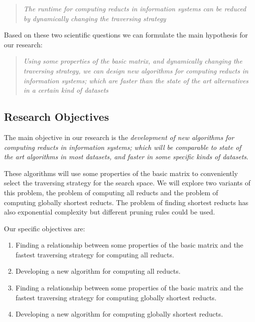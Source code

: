 \documentclass[authoryear,11pt]{elsarticle}
\begin{document}
\begin{quote}
  \emph{The runtime for computing reducts in information systems can be reduced by 
  		dynamically changing the traversing strategy}
\end{quote}

  Based on these two scientific questions we can formulate the main hypothesis for our research:
  
\begin{quote}
  \emph{Using some properties of the basic matrix, and dynamically changing the traversing 
  		strategy, we can design new algorithms for computing reducts in information systems; which are
  		faster than the state of the art alternatives in a certain kind of datasets}
\end{quote}  

\subsection{Research Objectives}\label{Goals} 
  The main objective in our research is the \emph{development of new algorithms for computing reducts in
  information systems; which will be comparable to state of the art algorithms 
  in most datasets, and faster in some specific kinds of datasets}. 
  
  These algorithms will use some properties 
  of the basic matrix to conveniently select the traversing strategy for the search space. We will explore two
  variants of this problem, the problem of computing all reducts and the problem of computing globally 
  shortest reducts. The problem of finding shortest reducts has also 
  exponential complexity \citep{Lin04} but different pruning rules could be used.
  
  Our specific objectives are:
  \begin{enumerate}
  \item Finding a relationship between some properties of the basic matrix and the fastest 
  		traversing strategy for computing all reducts.
  
  \item Developing a new algorithm for computing all reducts.
  		
  \item Finding a relationship between some properties of the basic matrix and the fastest 
  		traversing strategy for computing globally shortest reducts.
  
  \item Developing a new algorithm for computing globally shortest reducts.

  \end{enumerate}
\end{document}
